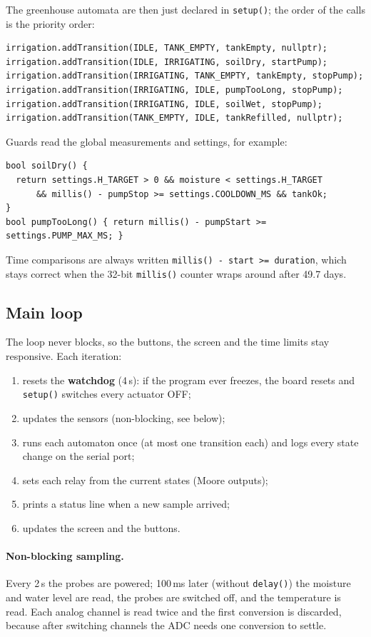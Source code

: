 \documentclass[10pt,a4paper,twocolumn]{article}
\newcommand{\code}[1]{\texttt{#1}}
\begin{document}
The greenhouse automata are then just declared in \code{setup()}; the order of the
calls is the priority order:

\begin{lstlisting}
irrigation.addTransition(IDLE, TANK_EMPTY, tankEmpty, nullptr);
irrigation.addTransition(IDLE, IRRIGATING, soilDry, startPump);
irrigation.addTransition(IRRIGATING, TANK_EMPTY, tankEmpty, stopPump);
irrigation.addTransition(IRRIGATING, IDLE, pumpTooLong, stopPump);
irrigation.addTransition(IRRIGATING, IDLE, soilWet, stopPump);
irrigation.addTransition(TANK_EMPTY, IDLE, tankRefilled, nullptr);
\end{lstlisting}

Guards read the global measurements and settings, for example:

\begin{lstlisting}
bool soilDry() {
  return settings.H_TARGET > 0 && moisture < settings.H_TARGET
      && millis() - pumpStop >= settings.COOLDOWN_MS && tankOk;
}
bool pumpTooLong() { return millis() - pumpStart >= settings.PUMP_MAX_MS; }
\end{lstlisting}

Time comparisons are always written \code{millis() - start >= duration}, which stays
correct when the 32-bit \code{millis()} counter wraps around after 49.7 days.

\subsection{Main loop}
The loop never blocks, so the buttons, the screen and the time limits stay responsive.
Each iteration:
\begin{enumerate}
  \item resets the \textbf{watchdog} (4\,s): if the program ever freezes, the board
        resets and \code{setup()} switches every actuator OFF;
  \item updates the sensors (non-blocking, see below);
  \item runs each automaton once (at most one transition each) and logs every state
        change on the serial port;
  \item sets each relay from the current states (Moore outputs);
  \item prints a status line when a new sample arrived;
  \item updates the screen and the buttons.
\end{enumerate}

\paragraph{Non-blocking sampling.} Every 2\,s the probes are powered; 100\,ms later
(without \code{delay()}) the moisture and water level are read, the probes are
switched off, and the temperature is read. Each analog channel is read twice and the
first conversion is discarded, because after switching channels the ADC needs one
conversion to settle.
\end{document}
